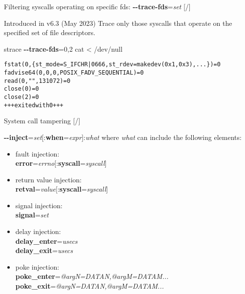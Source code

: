 \documentclass[unicode,aspectratio=169,xcolor={table,dvipsnames,usernames}]{beamer}
\begin{document}
\begin{frame}[fragile]{Filtering syscalls operating on specific fds: \textbf{-{}-trace-fds}=\textit{set} \hfill [\insertframenumber/\inserttotalframenumber]}
\large
\begin{block}{Introduced in v6.3 (May 2023)}
Trace only those syscalls that operate on the specified set of file descriptors.
\end{block}
\begin{block}{strace \textbf{-{}-trace-fds}=0,2 cat < /dev/null }
\small
\begin{alltt}
fstat(0, \{st_mode=S_IFCHR|0666, st_rdev=makedev(0x1, 0x3), ...\}) = 0
fadvise64(0, 0, 0, POSIX_FADV_SEQUENTIAL) = 0
read(0, "", 131072)                     = 0
close(0)                                = 0
close(2)                                = 0
+++ exited with 0 +++
\end{alltt}
\end{block}
\end{frame}

\begin{frame}{System call tampering \hfill [\insertframenumber/\inserttotalframenumber]}
\large
\begin{block}{\textbf{-{}-inject}=\textit{set}[:\textbf{when}=\textit{expr}]:\textit{what}}
where \textit{what} can include the following elements:
\begin{itemize}
\item fault injection: \\
\textbf{error}=\textit{errno}[:\textbf{syscall}=\textit{syscall}]
\item return value injection: \\
\textbf{retval}=\textit{value}[:\textbf{syscall}=\textit{syscall}]
\item signal injection: \\
\textbf{signal}=\textit{set}
\item delay injection: \\
\textbf{delay\_enter}=\textit{usecs} \\
\textbf{delay\_exit}=\textit{usecs}
\item poke injection: \\
\textbf{poke\_enter}=\textit{@argN=DATAN,@argM=DATAM...} \\
\textbf{poke\_exit}=\textit{@argN=DATAN,@argM=DATAM...}
\end{itemize}
\end{block}
\end{frame}
\end{document}
